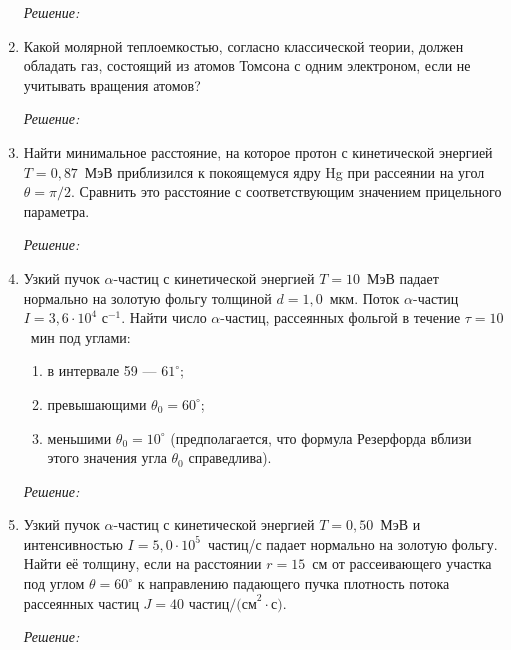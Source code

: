 \begin{enumerate}
\emph{Решение:}

\newpage

\item Какой молярной теплоемкостью, согласно классической теории, должен
обладать газ, состоящий из атомов Томсона с одним электроном, если не учитывать
вращения атомов?

\emph{Решение:}

\newpage

\item Найти минимальное расстояние, на которое протон с кинетической энергией
\( T = 0,\!87 \)~МэВ приблизился к покоящемуся ядру Hg при рассеянии на угол
\( \theta = \pi/2 \). Сравнить это расстояние с соответствующим значением
прицельного параметра.

\emph{Решение:}

\newpage

\item Узкий пучок \( \alpha \)-частиц с кинетической энергией \( T = 1\!0 \)~МэВ
падает нормально на золотую фольгу толщиной \( d = 1,\!0 \)~мкм. Поток
\( \alpha \)-частиц \( I = 3,\!6 \cdot 10^4\text{~с}^{-1} \). Найти число
\( \alpha \)-частиц, рассеянных фольгой в течение \( \tau = 10\)~мин под углами:
\begin{enumerate}
    \item в интервале 59 --- \( 61^\circ \);
    \item превышающими \( \theta_0 = 60^\circ \);
    \item меньшими \( \theta_0 = 10^\circ \) (предполагается, что формула
    Резерфорда вблизи этого значения угла \( \theta_0 \) справедлива).
\end{enumerate}

\emph{Решение:}

\newpage

\item Узкий пучок \( \alpha \)-частиц с кинетической энергией \( T=0,\!50 \)~МэВ
и интенсивностью \( I = 5,\!0\cdot10^5 \)~частиц/с падает нормально на золотую
фольгу. Найти её толщину, если на расстоянии \( r = 15 \)~см от рассеивающего
участка под углом \( \theta = 60^\circ \) к направлению падающего пучка
плотность потока рассеянных частиц \( J =40\text{~частиц/(см}^2\cdot\text{с)}\).

\emph{Решение:}

\end{enumerate}
